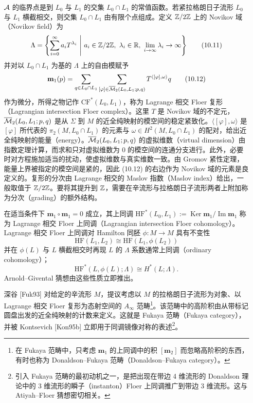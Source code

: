 $\mathcal{A}$ 的临界点是到 $L_0$ 与 $L_1$ 的交集 $L_0\cap L_1$ 的常值函数。若紧拉格朗日子流形 $L_0$ 与 $L_1$ 横截相交，则交集 $L_0\cap L_1$ 由有限个点组成。定义 $\mathbb{Z}/2\mathbb{Z}$ 上的 Novikov 域（Novikov field）为
\begin{equation}
    \Lambda=\left\{\sum_{i=0}^{\infty}a_iT^{\lambda_i}\ \middle|\ a_i\in\Z/2\Z,\ \lambda_i\in\R,\ \lim_{i\to\infty}\lambda_i\to\infty\right\} \tag{10.11}
\end{equation}
并对以 $L_0\cap L_1$ 为基的 $\Lambda$ 上的自由模赋予
\begin{equation}
    \mathbf{m}_1(p)=\sum_{q\in L_0\cap L_1}\sum_{[\varphi]\in\overline{\mathcal{M}}_2(L_0,L_1;p,q)}T^{\langle[\varphi],\omega\rangle}q \tag{10.12}
\end{equation}
作为微分，所得之物记作 $\mathrm{CF}^*(L_0,L_1)$，称为 Lagrange 相交 Floer 复形（Lagrangian intersection Floer complex）。这里 $T$ 是 Novikov 域的不定元，$\overline{\mathcal{M}}_2(L_0,L_1;p,q)$ 是从 $\Sigma$ 到 $M$ 的近全纯映射的模空间的稳定紧致化。$\langle[\varphi],\omega\rangle$ 是 $[\varphi]$ 所代表的 $\pi_2(M,L_0\cap L_1)$ 的元素与 $\omega\in H^2(M,L_0\cap L_1)$ 的配对，给出近全纯映射的能量（energy）。$\overline{\mathcal{M}}_2(L_0,L_1;p,q)$ 的虚拟维数（virtual dimension）由指数定理计算，而求和只对虚拟维数为 0 的模空间的连通分支进行。此外，必要时对方程施加适当的扰动，使虚拟维数与真实维数一致。由 Gromov 紧性定理，能量上界被指定的模空间是紧的，因此 (10.12) 的右边作为 Novikov 域的元素是良定义的。复形的分次由 Lagrange 相交的 Maslov 指数（Maslov index）给出，一般取值于 $\mathbb{Z}/2\mathbb{Z}$。要将其提升到 $\mathbb{Z}$，需要在辛流形与拉格朗日子流形两者上附加称为分次（grading）的额外结构。

在适当条件下 $\mathbf{m}_1\circ\mathbf{m}_1=0$ 成立，其上同调 $\mathrm{HF}^*(L_0,L_1):=\operatorname{Ker}\mathbf{m}_1/\operatorname{Im}\mathbf{m}_1$ 称为 Lagrange 相交 Floer 上同调（Lagrangian intersection Floer cohomology）。Lagrange 相交 Floer 上同调对 Hamilton 同胚 $\phi\colon M\to M$ 具有不变性
\begin{equation}
    \mathrm{HF}(L_1,L_2)\cong\mathrm{HF}(L_1,\phi(L_2)) \tag{10.13}
\end{equation}
并在 $\phi(L)$ 与 $L$ 横截相交时再现 $L$ 的 $\Lambda$ 系数通常上同调（ordinary cohomology）；
\begin{equation}
    \mathrm{HF}^*(L,\phi(L);\Lambda)\cong H^*(L;\Lambda). \tag{10.14}
\end{equation}
Arnold–Givental 猜想由这些性质立即推出。

深谷 [Fuk93] 对给定的辛流形 $M$，提议考虑以 $M$ 的拉格朗日子流形为对象、以 Lagrange 相交 Floer 复形为态射空间的 $A_\infty$ 范畴\footnote{在 Fukaya 范畴中，只考虑 $\mathbf{m}_1$ 的上同调中的积 $[\mathbf{m}_2]$ 而忽略高阶积的东西，有时也称为 Donaldson–Fukaya 范畴（Donaldson–Fukaya category）。}。该范畴中的高阶积由从带标记圆盘出发的近全纯映射的计数来定义。这就是 Fukaya 范畴（Fukaya category），并被 Kontsevich [Kon95b] 立即用于同调镜像对称的表述\footnote{引入 Fukaya 范畴的最初动机之一，是把出现在带边 4 维流形的 Donaldson 理论中的 3 维流形的瞬子（instanton）Floer 上同调推广到带边 3 维流形。这与 Atiyah–Floer 猜想密切相关。}。

